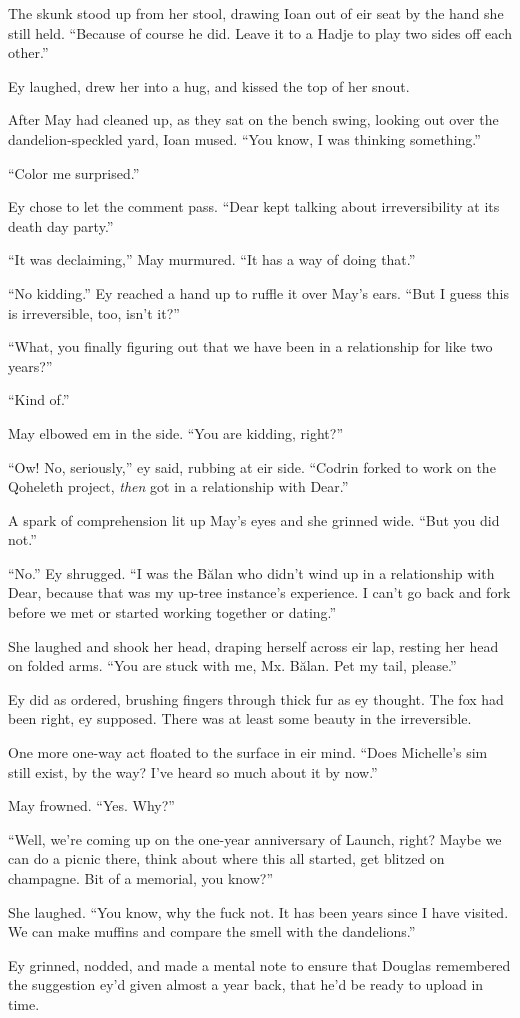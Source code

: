 The skunk stood up from her stool, drawing Ioan out of eir seat by the hand she still held. ``Because of course he did. Leave it to a Hadje to play two sides off each other.''

Ey laughed, drew her into a hug, and kissed the top of her snout.

After May had cleaned up, as they sat on the bench swing, looking out over the dandelion-speckled yard, Ioan mused. ``You know, I was thinking something.''

``Color me surprised.''

Ey chose to let the comment pass. ``Dear kept talking about irreversibility at its death day party.''

``It was declaiming,'' May murmured. ``It has a way of doing that.''

``No kidding.'' Ey reached a hand up to ruffle it over May's ears. ``But I guess this is irreversible, too, isn't it?''

``What, you finally figuring out that we have been in a relationship for like two years?''

``Kind of.''

May elbowed em in the side. ``You are kidding, right?''

``Ow! No, seriously,'' ey said, rubbing at eir side. ``Codrin forked to work on the Qoheleth project, \emph{then} got in a relationship with Dear.''

A spark of comprehension lit up May's eyes and she grinned wide. ``But you did not.''

``No.'' Ey shrugged. ``I was the Bălan who didn't wind up in a relationship with Dear, because that was my up-tree instance's experience. I can't go back and fork before we met or started working together or dating.''

She laughed and shook her head, draping herself across eir lap, resting her head on folded arms. ``You are stuck with me, Mx. Bălan. Pet my tail, please.''

Ey did as ordered, brushing fingers through thick fur as ey thought. The fox had been right, ey supposed. There was at least some beauty in the irreversible.

One more one-way act floated to the surface in eir mind. ``Does Michelle's sim still exist, by the way? I've heard so much about it by now.''

May frowned. ``Yes. Why?''

``Well, we're coming up on the one-year anniversary of Launch, right? Maybe we can do a picnic there, think about where this all started, get blitzed on champagne. Bit of a memorial, you know?''

She laughed. ``You know, why the fuck not. It has been years since I have visited. We can make muffins and compare the smell with the dandelions.''

Ey grinned, nodded, and made a mental note to ensure that Douglas remembered the suggestion ey'd given almost a year back, that he'd be ready to upload in time.
